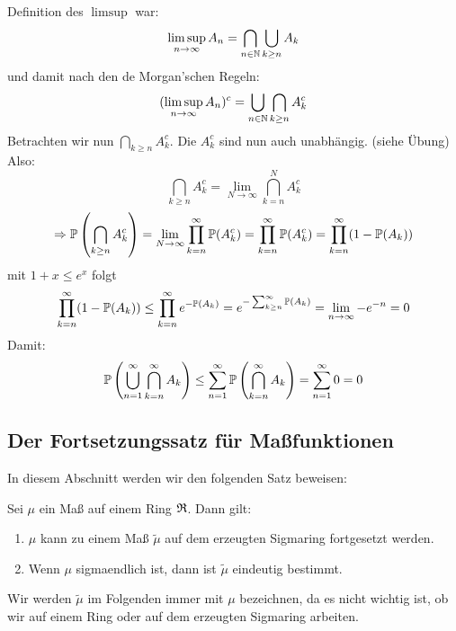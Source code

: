 			\begin{bew}
				Definition des $\limsup$ war:
				\[ \limsup_{n\to\infty} A_n=\bigcap_{n\in\N}\bigcup_{k\ge n} A_k \]
				und damit nach den de Morgan'schen Regeln:
				\[ (\limsup_{n\to\infty} A_n)^c=\bigcup_{n\in\N}\bigcap_{k\ge n} A_k^c \]
				Betrachten wir nun $\bigcap_{k\ge n} A_k^c$. Die $A_k^c$ sind nun auch unabhängig. (siehe Übung) Also:
				\[ \bigcap_{k\ge n} A_k^c = \lim_{N\to\infty} \bigcap_{k=n}^N A_k^c \]
				\[ \Rightarrow \P\left(\bigcap_{k\ge n} A_k^c\right)=\lim_{N\to\infty}\prod_{k=n}^\infty \P(A_k^c)=\prod_{k=n}^\infty \P(A_k^c)=\prod_{k=n}^\infty (1-\P(A_k)) \]
				mit $1+x\le e^x$ folgt
				\[ \prod_{k=n}^\infty (1-\P(A_k)) \le\prod_{k=n}^\infty e^{-\P(A_k)}=e^{-\sum_{k\ge n}^\infty \P(A_k)}=\lim_{n\to \infty} -e^{-n}=0 \]
				Damit:
				\[ \P\left(\bigcup_{n=1}^\infty\bigcap_{k=n}^\infty A_k\right)\le \sum_{n=1}^\infty \P\left(\bigcap_{k=n}^\infty A_k\right)=\sum_{n=1}^\infty 0=0 \]\arge
			\end{bew}
			
			\subsection{Der Fortsetzungssatz für Maßfunktionen}
			
			In diesem Abschnitt werden wir den folgenden Satz beweisen:
			\begin{satz}
				Sei $\mu$ ein Maß auf einem Ring $\mf{R}$. Dann gilt:
				\begin{enumerate}
					\item $\mu$ kann zu einem Maß $\widetilde{\mu}$ auf dem erzeugten Sigmaring fortgesetzt werden. 
					\item Wenn $\mu$ sigmaendlich ist, dann ist $\widetilde{\mu}$ eindeutig bestimmt. 
				\end{enumerate}
				
			\end{satz}
			
			\begin{bem}
				Wir werden $\widetilde{\mu}$ im Folgenden immer mit $\mu$ bezeichnen, da es nicht wichtig ist, ob wir auf einem Ring oder auf dem erzeugten Sigmaring arbeiten. 
			\end{bem}
			

